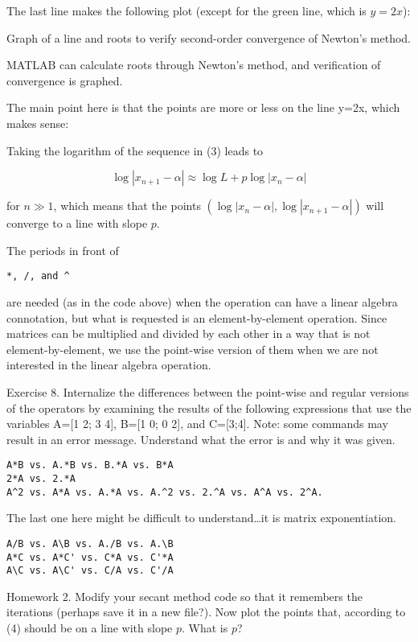 \documentclass[a4paper,12pt]{article}
\begin{document}
The last line makes the following plot (except for the green line, which is \(y=2x\)):

Graph of a line and roots to verify second-order convergence of Newton's method.

MATLAB can calculate roots through Newton's method, and verification of convergence is graphed.

The main point here is that the points are more or less on the line y=2x, which makes sense:

Taking the logarithm of the sequence in (3) leads to

\begin{equation} \label{eq:convergence:plots} \log|{x_{n+1}-\alpha}| \approx \log L + p\log|{x_{n}-\alpha}| \end{equation}

for \(n\gg1\), which means that the points \((\log|{x_{n}-\alpha}|, \log|{x_{n+1}-\alpha}|)\) will converge to a line with slope \(p\).

The periods in front of \begin{verbatim}*, /, and ^ \end{verbatim} are needed (as in the code above) when the operation can have a linear algebra connotation, but what is requested is an element-by-element operation. Since matrices can be multiplied and divided by each other in a way that is not element-by-element, we use the point-wise version of them when we are not interested in the linear algebra operation.

Exercise 8. Internalize the differences between the point-wise and regular versions of the operators by examining the results of the following expressions that use the variables A=[1 2; 3 4], B=[1 0; 0 2], and C=[3;4]. Note: some commands may result in an error message. Understand what the error is and why it was given.
\begin{verbatim}
A*B vs. A.*B vs. B.*A vs. B*A
2*A vs. 2.*A
A^2 vs. A*A vs. A.*A vs. A.^2 vs. 2.^A vs. A^A vs. 2^A. 
\end{verbatim}
The last one here might be difficult to understand…it is matrix exponentiation.
\begin{verbatim}
A/B vs. A\B vs. A./B vs. A.\B
A*C vs. A*C' vs. C*A vs. C'*A
A\C vs. A\C' vs. C/A vs. C'/A
\end{verbatim}

Homework 2. Modify your secant method code so that it remembers the iterations (perhaps save it in a new file?). Now plot the points that, according to (4) should be on a line with slope \(p\). What is \(p\)?
\end{document}
